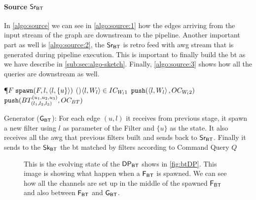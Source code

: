 \paragraph{Source $\mathsf{Sr_{BT}}$} In \autoref{algo:source} we can see in \autoref{algo:source:1} how the edges arriving from the input stream of the graph are downstream to the pipeline. 
Another important part as well is \autoref{algo:source:2}, the $\mathsf{Sr_{BT}}$ is retro feed with \acrshort{awg} stream that is generated during pipeline execution.
This is important to finally build the \acrshort{bt} as we have describe in \autoref{sub:sec:algo-sketch}. Finally, \autoref{algo:source:3} shows how all the queries are downstream as well.

\begin{algorithm}[h!]
\SetAlgoRefName{[A2]}
\P{$F$}
{$\mathtt{spawn}(F, l, \left\langle l, \{u\} \right\rangle)$ \label{algo:gen:1}
}
\ForAll(){$\left\langle l, W_l \right\rangle \in IC_{W_l1}$}
{$\mathtt{push}(\left\langle l, W_l \right\rangle, OC_{W_l2})$ \label{algo:gen:2}
}
{$\mathtt{push}(BT_{(l_1, l_2,l_3)}^{(u_1, u_2, u_3)}, OC_{BT})$ \label{algo:gen:3}
}
\caption[Generator ($\gbt$)]{Generator ($\gbt$): For each edge $(u,l)$ it receives from previous stage, it spawn a new filter using $l$ as parameter of the Filter and $\{u\}$ as the state. It also receives all the \acrshort{awg} that previous filters built and sends back to $\mathsf{Sr_{BT}}$. Finally it sends to the $\mathsf{Sk_{BT}}$ the \acrshort{bt} matched by filters according to Command Query $Q$}
\label{algo:gen}
\end{algorithm}

\begin{figure}[h]
\centering  
{}
\caption[{[\acrshort{iebt}] ]$\dpbt$ With Filter instances}]{This is the evolving state of the $\dpbt$ shows in \autoref{fig:btDP}. This image is showing what happen when a $\mathsf{F_{BT}}$ is spawned. We can see how all the channels are set up in the middle of the spawned $\mathsf{F_{BT}}$ and also between $\mathsf{F_{BT}}$ and $\gbt$.}
\label{fig:btDP_actor1}
\end{figure}

